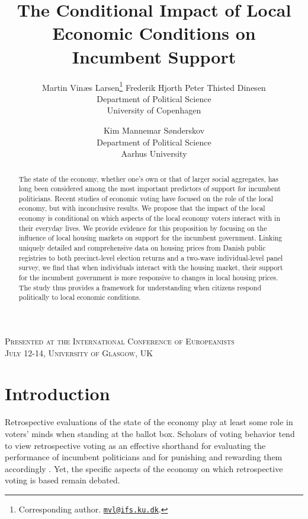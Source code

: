 \documentclass[12pt,a4paper]{article}
\title{\textbf{The Conditional Impact of Local Economic Conditions on Incumbent Support}}
\author{Martin Vinæs Larsen\thanks{Corresponding author. \href{mailto:mvl@ifs.ku.dk}{\texttt{mvl@ifs.ku.dk}}. } \qquad Frederik Hjorth \qquad Peter Thisted  Dinesen \\Department of Political Science \\ University of Copenhagen \and Kim Mannemar  Sønderskov  \\Department of Political Science \\ Aarhus University   }
\begin{document}
	
	\maketitle
	
	\begin{center}
		\textsc{Presented at the International Conference of Europeanists \\
			July 12-14, University of Glasgow, UK }
	\end{center}
	
	\begin{abstract} \noindent The state of the economy, whether one’s own or that of larger social aggregates, has long been considered among the most important predictors of support for incumbent politicians. Recent studies of economic voting have focused on the role of the local economy, but with inconclusive results. We propose that the impact of the local economy is conditional on which aspects of the local economy voters interact with in their everyday lives. We provide evidence for this proposition by focusing on the influence of local housing markets on support for the incumbent government. Linking uniquely detailed and comprehensive data on housing prices from Danish public registries to both precinct-level election returns and a two-wave individual-level panel survey, we find that when individuals interact with the housing market, their support for the incumbent government is more responsive to changes in local housing prices. The study thus provides a framework for understanding when citizens respond politically to local economic conditions.
		
	\end{abstract}
	
	
	
	\newpage
	
	\onehalfspacing
	
	\section{Introduction}
	
	\noindent Retrospective evaluations of the state of the economy play at least some role in voters' minds when standing at the ballot box. Scholars of voting behavior tend to view retrospective voting as an effective shorthand for evaluating the performance of incumbent politicians and for punishing and rewarding them accordingly \citep{ashworth2012electoral,healy2013retrospective}. Yet, the specific aspects of the economy on which retrospective voting is based remain debated. 
	
\end{document}
